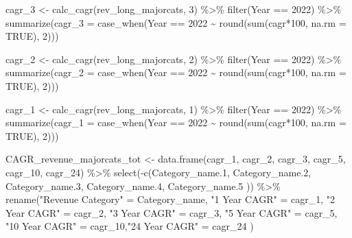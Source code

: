 \documentclass[
  letterpaper,
  DIV=11,
  numbers=noendperiod]{scrreport}
\newenvironment{Shaded}{\begin{snugshade}}{\end{snugshade}}
\newcommand{\AttributeTok}[1]{\textcolor[rgb]{0.40,0.45,0.13}{#1}}
\newcommand{\ConstantTok}[1]{\textcolor[rgb]{0.56,0.35,0.01}{#1}}
\newcommand{\DecValTok}[1]{\textcolor[rgb]{0.68,0.00,0.00}{#1}}
\newcommand{\FloatTok}[1]{\textcolor[rgb]{0.68,0.00,0.00}{#1}}
\newcommand{\FunctionTok}[1]{\textcolor[rgb]{0.28,0.35,0.67}{#1}}
\newcommand{\NormalTok}[1]{\textcolor[rgb]{0.00,0.23,0.31}{#1}}
\newcommand{\OtherTok}[1]{\textcolor[rgb]{0.00,0.23,0.31}{#1}}
\newcommand{\SpecialCharTok}[1]{\textcolor[rgb]{0.37,0.37,0.37}{#1}}
\newcommand{\StringTok}[1]{\textcolor[rgb]{0.13,0.47,0.30}{#1}}
\begin{document}
\begin{Shaded}
\begin{Highlighting}[]
\NormalTok{cagr\_3 }\OtherTok{\textless{}{-}} \FunctionTok{calc\_cagr}\NormalTok{(rev\_long\_majorcats, }\DecValTok{3}\NormalTok{) }\SpecialCharTok{\%\textgreater{}\%} 
  \FunctionTok{filter}\NormalTok{(Year }\SpecialCharTok{==} \DecValTok{2022}\NormalTok{) }\SpecialCharTok{\%\textgreater{}\%}
  \FunctionTok{summarize}\NormalTok{(}\AttributeTok{cagr\_3 =} \FunctionTok{case\_when}\NormalTok{(Year }\SpecialCharTok{==} \DecValTok{2022} \SpecialCharTok{\textasciitilde{}} \FunctionTok{round}\NormalTok{(}\FunctionTok{sum}\NormalTok{(cagr}\SpecialCharTok{*}\DecValTok{100}\NormalTok{, }\AttributeTok{na.rm =} \ConstantTok{TRUE}\NormalTok{), }\DecValTok{2}\NormalTok{)))}

\NormalTok{cagr\_2 }\OtherTok{\textless{}{-}} \FunctionTok{calc\_cagr}\NormalTok{(rev\_long\_majorcats, }\DecValTok{2}\NormalTok{) }\SpecialCharTok{\%\textgreater{}\%} 
  \FunctionTok{filter}\NormalTok{(Year }\SpecialCharTok{==} \DecValTok{2022}\NormalTok{) }\SpecialCharTok{\%\textgreater{}\%}
  \FunctionTok{summarize}\NormalTok{(}\AttributeTok{cagr\_2 =} \FunctionTok{case\_when}\NormalTok{(Year }\SpecialCharTok{==} \DecValTok{2022} \SpecialCharTok{\textasciitilde{}} \FunctionTok{round}\NormalTok{(}\FunctionTok{sum}\NormalTok{(cagr}\SpecialCharTok{*}\DecValTok{100}\NormalTok{, }\AttributeTok{na.rm =} \ConstantTok{TRUE}\NormalTok{), }\DecValTok{2}\NormalTok{)))}

\NormalTok{ cagr\_1 }\OtherTok{\textless{}{-}} \FunctionTok{calc\_cagr}\NormalTok{(rev\_long\_majorcats, }\DecValTok{1}\NormalTok{) }\SpecialCharTok{\%\textgreater{}\%} 
  \FunctionTok{filter}\NormalTok{(Year }\SpecialCharTok{==} \DecValTok{2022}\NormalTok{) }\SpecialCharTok{\%\textgreater{}\%}
  \FunctionTok{summarize}\NormalTok{(}\AttributeTok{cagr\_1 =} \FunctionTok{case\_when}\NormalTok{(Year }\SpecialCharTok{==} \DecValTok{2022} \SpecialCharTok{\textasciitilde{}} \FunctionTok{round}\NormalTok{(}\FunctionTok{sum}\NormalTok{(cagr}\SpecialCharTok{*}\DecValTok{100}\NormalTok{, }\AttributeTok{na.rm =} \ConstantTok{TRUE}\NormalTok{), }\DecValTok{2}\NormalTok{)))}

\NormalTok{CAGR\_revenue\_majorcats\_tot }\OtherTok{\textless{}{-}} \FunctionTok{data.frame}\NormalTok{(cagr\_1, cagr\_2, cagr\_3, cagr\_5, cagr\_10, cagr\_24) }\SpecialCharTok{\%\textgreater{}\%}   
  \FunctionTok{select}\NormalTok{(}\SpecialCharTok{{-}}\FunctionTok{c}\NormalTok{(Category\_name}\FloatTok{.1}\NormalTok{, Category\_name}\FloatTok{.2}\NormalTok{, Category\_name}\FloatTok{.3}\NormalTok{, Category\_name}\FloatTok{.4}\NormalTok{, Category\_name}\FloatTok{.5}\NormalTok{ )) }\SpecialCharTok{\%\textgreater{}\%} 
  \FunctionTok{rename}\NormalTok{(}\StringTok{"Revenue Category"} \OtherTok{=}\NormalTok{ Category\_name, }\StringTok{"1 Year CAGR"} \OtherTok{=}\NormalTok{ cagr\_1, }\StringTok{"2 Year CAGR"} \OtherTok{=}\NormalTok{ cagr\_2, }\StringTok{"3 Year CAGR"} \OtherTok{=}\NormalTok{ cagr\_3, }\StringTok{"5 Year CAGR"} \OtherTok{=}\NormalTok{ cagr\_5, }\StringTok{"10 Year CAGR"} \OtherTok{=}\NormalTok{ cagr\_10,}\StringTok{"24 Year CAGR"} \OtherTok{=}\NormalTok{ cagr\_24 )}


\end{Highlighting}
\end{Shaded}
\end{document}
